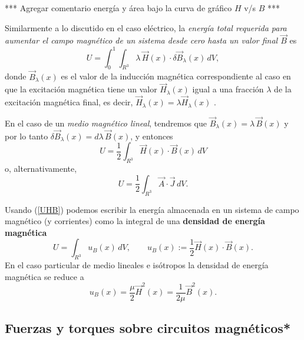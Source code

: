 *** Agregar comentario energía y área bajo la curva de gráfico $H$ v/s $B$ ***

Similarmente a lo discutido en el caso eléctrico, la \textit{energía total requerida para aumentar el campo magnético de un sistema desde cero hasta un valor final $\vec{B}$} es 
\begin{equation}
 U=\int_0^1\int_{R^3} \lambda \, \vec{H}(x)\cdot \delta\vec{B}_\lambda(x)\,dV,
\end{equation}
donde $\vec{B}_\lambda(x)$ es el valor de la inducción magnética correspondiente al caso en que la excitación magnética tiene un valor $\vec{H}_\lambda(x)$ igual a una fracción $\lambda$ de la excitación magnética final, es decir, $\vec{H}_\lambda (x)=\lambda\vec{H}_\lambda (x)$ .

En el caso de un \textit{medio magnético lineal}, tendremos que $\vec{B}_\lambda (x)=\lambda\, \vec{B}(x)$ y por lo tanto $\delta\vec{B}_\lambda (x)=d\lambda\,
\vec{B}(x)$, y entonces
\begin{equation}\label{UHB}
 \boxed{U=\frac{1}{2}\int_{R^3} \vec{H}(x)\cdot\vec{B}(x)\,dV }
\end{equation}
o, alternativamente, 
\begin{equation}
 \boxed{U=\frac{1}{2}\int_{R^3} \vec{A}\cdot \vec{J}\,dV.}
\end{equation}

Usando (\ref{UHB}) podemos escribir la energía almacenada en un sistema de campo magnético (y corrientes) como la integral de una \textbf{densidad de energía magnética}
\begin{equation}
 \boxed{U=\int_{R^3} u_B(x)\,dV, \qquad u_B(x):=\frac{1}{2}\vec{H}(x)\cdot\vec{B}(x).}
\end{equation}
En el caso particular de medio lineales e isótropos la densidad de energía magnética se reduce a
\begin{equation}
 u_B(x)=\frac{\mu}{2}\vec{H}^2(x)=\frac{1}{2\mu}\vec{B}^2(x).
\end{equation}


\subsection{Fuerzas y torques sobre circuitos magnéticos*}
%


